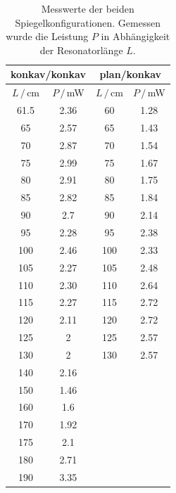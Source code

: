 \begin{table}
    \center
    \caption{Messwerte der beiden Spiegelkonfigurationen. Gemessen wurde die Leistung $P$ in Abhängigkeit der Resonatorlänge $L$.}
    \begin{tabular}{c c | c c}
        \multicolumn{2}{|c|}{konkav/konkav} &\multicolumn{2}{|c|}{plan/konkav} \\
        \hline
        $L\,/\,$cm & $P\,/\,$mW & $L\,/\,$cm & $P\,/\,$mW\\
        \midrule
        61.5&        2.36&  60& 1.28\\
        65  &        2.57&  65& 1.43\\
        70  &        2.87&  70& 1.54\\
        75  &        2.99&  75& 1.67\\
        80  &        2.91&  80& 1.75\\
        85  &        2.82&  85& 1.84\\
        90  &        2.7&   90& 2.14\\
        95  &        2.28&  95& 2.38\\
        100 &        2.46&  100&2.33\\
        105 &        2.27&  105&2.48\\
        110 &        2.30&  110&2.64\\
        115 &        2.27&  115&2.72\\
        120 &        2.11&  120&2.72\\
        125 &        2&     125&2.57\\
        130 &        2&     130&2.57\\
        140 &        2.16&  &\\
        150 &        1.46&  &\\
        160 &        1.6&  &\\
        170 &        1.92&  &\\
        175 &        2.1&  &\\
        180 &        2.71&  &\\
        190 &        3.35&  &\\
        \bottomrule
    \end{tabular}
    \label{tab:stabil}
\end{table}


